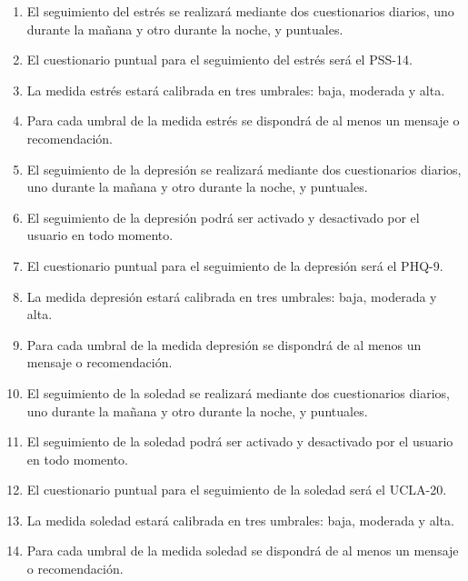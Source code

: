         \begin{enumerate}[label=\textbf{\texttt{RF-\arabic*}}]
            \item El seguimiento del estrés se realizará mediante dos cuestionarios diarios, uno durante la mañana y otro durante la noche, y puntuales.
            \item El cuestionario puntual para el seguimiento del estrés será el PSS-14.
            \item La medida estrés estará calibrada en tres umbrales: baja, moderada y alta.
            \item Para cada umbral de la medida estrés se dispondrá de al menos un mensaje o recomendación.
            \item El seguimiento de la depresión se realizará mediante dos cuestionarios diarios, uno durante la mañana y otro durante la noche, y puntuales.
            \item El seguimiento de la depresión podrá ser activado y desactivado por el usuario en todo momento.
            \item El cuestionario puntual para el seguimiento de la depresión será el PHQ-9.
            \item La medida depresión estará calibrada en tres umbrales: baja, moderada y alta.
            \item Para cada umbral de la medida depresión se dispondrá de al menos un mensaje o recomendación.
            \item El seguimiento de la soledad se realizará mediante dos cuestionarios diarios, uno durante la mañana y otro durante la noche, y puntuales.
            \item El seguimiento de la soledad podrá ser activado y desactivado por el usuario en todo momento.
            \item El cuestionario puntual para el seguimiento de la soledad será el UCLA-20.
            \item La medida soledad estará calibrada en tres umbrales: baja, moderada y alta.
            \item Para cada umbral de la medida soledad se dispondrá de al menos un mensaje o recomendación.


\end{enumerate}
